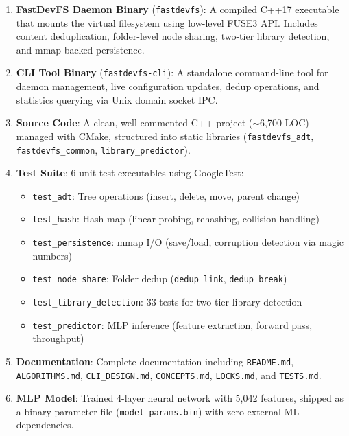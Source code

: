 \documentclass[12pt, a4paper]{article}
\begin{document}
\begin{enumerate}
  \item \textbf{FastDevFS Daemon Binary} (\texttt{fastdevfs}): A compiled C++17 executable that mounts the virtual filesystem using low-level FUSE3 API. Includes content deduplication, folder-level node sharing, two-tier library detection, and mmap-backed persistence.

  \item \textbf{CLI Tool Binary} (\texttt{fastdevfs-cli}): A standalone command-line tool for daemon management, live configuration updates, dedup operations, and statistics querying via Unix domain socket IPC.

  \item \textbf{Source Code}: A clean, well-commented C++ project ($\sim$6,700 LOC) managed with CMake, structured into static libraries (\texttt{fastdevfs\_adt}, \texttt{fastdevfs\_common}, \texttt{library\_predictor}).

  \item \textbf{Test Suite}: 6 unit test executables using GoogleTest:
    \begin{itemize}
      \item \texttt{test\_adt}: Tree operations (insert, delete, move, parent change)
      \item \texttt{test\_hash}: Hash map (linear probing, rehashing, collision handling)
      \item \texttt{test\_persistence}: mmap I/O (save/load, corruption detection via magic numbers)
      \item \texttt{test\_node\_share}: Folder dedup (\texttt{dedup\_link}, \texttt{dedup\_break})
      \item \texttt{test\_library\_detection}: 33 tests for two-tier library detection
      \item \texttt{test\_predictor}: MLP inference (feature extraction, forward pass, throughput)
    \end{itemize}

  \item \textbf{Documentation}: Complete documentation including \texttt{README.md}, \texttt{ALGORITHMS.md}, \texttt{CLI\_DESIGN.md}, \texttt{CONCEPTS.md}, \texttt{LOCKS.md}, and \texttt{TESTS.md}.

  \item \textbf{MLP Model}: Trained 4-layer neural network with 5,042 features, shipped as a binary parameter file (\texttt{model\_params.bin}) with zero external ML dependencies.
\end{enumerate}
\end{document}
